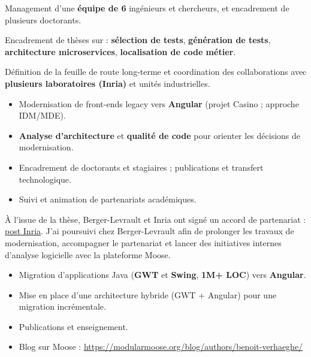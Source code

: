 \documentclass[10pt,a4paper,ragged2e,withhyper]{altacv}
\begin{document}
Management d’une \textbf{équipe de 6} ingénieurs et chercheurs, et encadrement de plusieurs doctorants.

Encadrement de thèses sur : \textbf{sélection de tests}, \textbf{génération de tests}, \textbf{architecture microservices}, \textbf{localisation de code métier}.

Définition de la feuille de route long-terme et coordination des collaborations avec \textbf{plusieurs laboratoires (Inria)} et unités industrielles.

\divider

\begin{itemize}
  \item Modernisation de front-ends legacy vers \textbf{Angular} (projet Casino ; approche IDM/MDE).
  \item \textbf{Analyse d’architecture} et \textbf{qualité de code} pour orienter les décisions de modernisation.
  \item Encadrement de doctorants et stagiaires ; publications et transfert technologique.
  \item Suivi et animation de partenariats académiques.
\end{itemize}

À l’issue de la thèse, Berger-Levrault et Inria ont signé un accord de partenariat :
\href{https://www.inria.fr/fr/berger-levrault-inria-partenariat-numerique-responsable}{post Inria}.
J’ai poursuivi chez Berger-Levrault afin de prolonger les travaux de modernisation, accompagner le partenariat et lancer des initiatives internes d’analyse logicielle avec la plateforme Moose.

\divider

\begin{itemize}
  \item Migration d’applications Java (\textbf{GWT} et \textbf{Swing}, \textbf{1M+ LOC}) vers \textbf{Angular}.
  \item Mise en place d’une architecture hybride (GWT + Angular) pour une migration incrémentale.
  \item Publications et enseignement.
  \item Blog sur Moose : \url{https://modularmoose.org/blog/authors/benoit-verhaeghe/}
\end{itemize}
\end{document}

